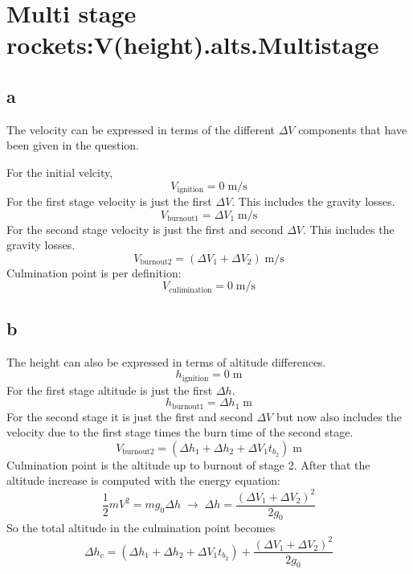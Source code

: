 \section{ Multi stage rockets:V(height).alts.Multistage }\label{sec:q3}    
\subsection{a}
The velocity can be expressed in terms of the different $\Delta V$ components that have been given in the question. 

For the initial velcity, 
\begin{equation}
V_\text{ignition} = 0\;\text{m/s}
\end{equation}
For the first stage velocity is just the first $\Delta V$. This includes the gravity losses.
\begin{equation}
V_\text{burnout1} = \Delta V_1\;\text{m/s}
\end{equation}
For the second stage velocity is just the first and second $\Delta V$. This includes the gravity losses.
\begin{equation}
V_\text{burnout2} = (\Delta V_1+\Delta V_2)\;\text{m/s}
\end{equation}
Culmination point is per definition:
\begin{equation}
V_\text{culimination} = 0\;\text{m/s}
\end{equation}
\subsection{b}
The height can also be expressed in terms of altitude differences.
\begin{equation}
h_\text{ignition} = 0\;\text{m}
\end{equation}
For the first stage altitude is just the first $\Delta h$. 
\begin{equation}
h_\text{burnout1} = \Delta h_1\;\text{m}
\end{equation}
For the second stage it is just the first and second $\Delta V$ but now also includes the velocity due to the first stage times the burn time of the second stage. 
\begin{equation}
V_\text{burnout2} = (\Delta h_1+\Delta h_2+\Delta V_1t_{b_2})\;\text{m}
\end{equation}
Culmination point is the altitude up to burnout of stage 2. After that the altitude increase is computed with the energy equation:
\begin{equation}
\frac{1}{2}mV^2=mg_0\Delta h\;\rightarrow\;\Delta h = \frac{(\Delta V_1+\Delta V_2)^2}{2g_0}
\end{equation}
So the total altitude in the culmination point becomes
\begin{equation}
\Delta h_c =  (\Delta h_1+\Delta h_2+\Delta V_1t_{b_2})+\frac{(\Delta V_1+\Delta V_2)^2}{2g_0}
\end{equation}


